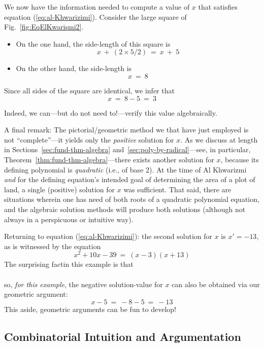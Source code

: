 \smallskip

We now have the information needed to compute a value of $x$ that satisfies equation (\ref{eq:al-Khwarizimi}).  Consider the large square of Fig.~\ref{fig:EqElKwarismi2}.

\begin{itemize}
\item
On the one hand, the side-length of this square is
\[ x \ + \ (2 \times 5/2) \ = \ x \ + \ 5 \]

\item
On the other hand, the side-length is
\[ x \ = \ 8 \]
\end{itemize}
Since all sides of the square are identical, we infer that
\[ x \ = \ 8-5 \ = \ 3 \]

\noindent
Indeed, we can---but do not need to!---verify this value algebraically.

\medskip

A final remark: The pictorial/geometric method we that have just employed is not ``complete''---it yields only the {\em positive} solution for $x$.  As we discuss at length in Sections~\ref{sec:fund-thm-algebra} and~\ref{sec:poly-by-radical}---see, in particular, Theorem~\ref{thm:fund-thm-algebra}---there exists another solution for $x$, because its defining polynomial is {\em quadratic} (i.e., of base $2$).  At the time of Al Khwarizmi {\em and} for the defining equation's intended goal of determining the area of a plot of land, a single (positive) solution for $x$ was sufficient.  That said, there are situations wherein one has need of both roots of a quadratic
polynomial equation, and the algebraic solution methods will produce both solutions (although not always in a perspicuous or intuitive way).

Returning to equation (\ref{eq:al-Khwarizimi}):  the second solution for $x$  is $x' = -13$, as is witnessed by the equation
\[ x^2 + 10x - 39 \ = \ (x-3)(x+13) \]
The surprising factin this example is that \\
\hspace*{.2in}{\em $64$ is also the square of $-8$} \\
so, {\em for this example}, the negative solution-value for $x$ can also be obtained via our geometric argument:
\[ x - 5 \ = \ -8 -5 \ = \ -13 \]
This aside, geometric arguments can be fun to develop!


\subsection{Combinatorial Intuition and Argumentation}
\label{sec:comb-proofs}


